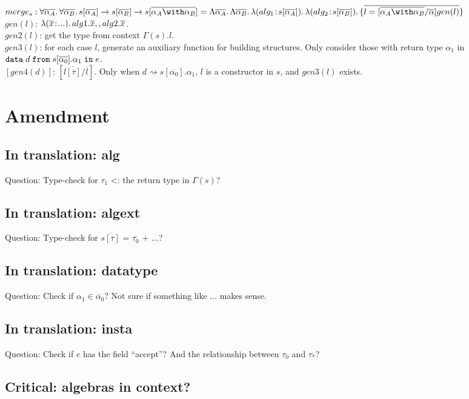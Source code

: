 \documentclass[a4paper]{article}
\begin{document}
$\mergealg$\\

$gen(l)$: $\lambda (\overline{x} \!:\! ...).\, alg1.\overline{x} ,, alg2.\overline{x}$.\\

$gen2(l)$: get the type from context $\Gamma(s).l$.\\

$gen3(l)$: for each case $l$, generate an auxiliary function for building structures. Only consider those with return type $\alpha_1$ in $\texttt{data} \; d \; \texttt{from} \; s {[} \overline{\alpha_0} {]} . \alpha_1 \; \texttt{in} \; e$.\\

$[gen4(d)]$: $[\overline{l[\overline{\tau}]}/\overline{l}]$. Only when $d \rightsquigarrow s[\overline{\alpha_0}].\alpha_1$, $l$ is a constructor in $s$, and $gen3(l)$ exists.

\section{Amendment}

\subsection{In translation: alg}

Question: Type-check for $\tau_1$ <: the return type in $\Gamma(s)$?

\subsection{In translation: algext}

Question: Type-check for $\overline{s[\overline{\tau}]}$ = $\overline{\tau_0}$ + ...?

\subsection{In translation: datatype}

Question: Check if $\alpha_1\in\overline{\alpha_0}$? Not sure if something like ... makes sense.

\subsection{In translation: insta}

Question: Check if $e$ has the field ``accept''? And the relationship between $\tau_0$ and $\tau_*$?

\subsection{Critical: algebras in context?}
\end{document}
